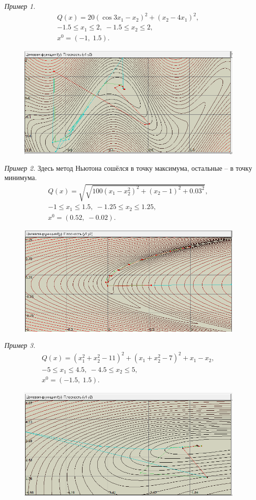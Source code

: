 \documentclass[12pt,a4paper]{article}
\begin{document}
\textit{Пример 1.}
\begin{gather*}
    Q(x) = 20(\cos{3x_1}-x_2)^2 + (x_2-4x_1)^2,\\
    -1.5 \le x_1 \le 2, \; -1.5 \le x_2 \le 2,\\
    x^0 = (-1, \; 1.5).
\end{gather*}

\begin{figure}[H]
    \centering
    \includegraphics{newton1.png}
\end{figure}

\textit{Пример 2.} Здесь метод Ньютона сошёлся в точку максимума, остальные -- в точку минимума.
\begin{gather*}
    Q(x) = \sqrt{\sqrt{100(x_1-x_2^2)^2 + (x_2-1)^2 + 0.03^2}},\\
    -1 \le x_1 \le 1.5, \; -1.25 \le x_2 \le 1.25,\\
    x^0 = (0.52, \; -0.02).
\end{gather*}        
\begin{figure}[H]
    \centering
    \includegraphics{newton2.png}
\end{figure}

\textit{Пример 3.}
\begin{gather*}
    Q(x) = (x_1^2+x_2^2-11)^2 + (x_1+x_2^2-7)^2+x_1-x_2,\\
    -5 \le x_1 \le 4.5, \; -4.5 \le x_2 \le 5,\\
    x^0=(-1.5, \; 1.5).
\end{gather*}

\begin{figure}[H]
    \centering
    \includegraphics{newton3.png}
\end{figure}
\end{document}
